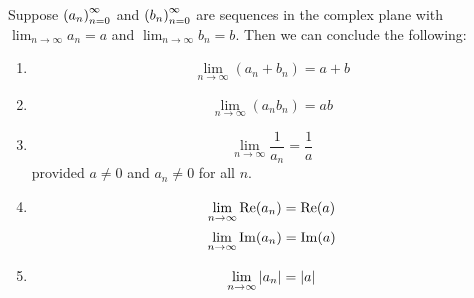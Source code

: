 \begin{theorem}
Suppose $\seq{a}$ and $\seq{b}$ are sequences in the complex plane with $\lim_{n\to\infty} a_n =a$ and $\lim_{n\to\infty} b_n = b$. Then we can conclude the following:
\begin{enumerate}
\item $$\lim_{n\to\infty} (a_n+b_n) = a+b$$
\item $$\lim_{n\to\infty} (a_nb_n) = ab$$
\item $$\lim_{n\to\infty} \frac{1}{a_n} = \frac{1}{a}$$ provided $a \neq 0$ and $a_n \neq 0$ for all $n$.
\item $$\lim_{n\to\infty} \operatorname{Re}({a_n}) = \operatorname{Re}({a})$$\newline $$\lim_{n\to\infty} \operatorname{Im}({a_n}) = \operatorname{Im}({a})$$ 
\item $$\lim_{n\to\infty} \left\lvert a_n \right\rvert = \left\lvert a \right\rvert$$
\end{enumerate}
\end{theorem}
